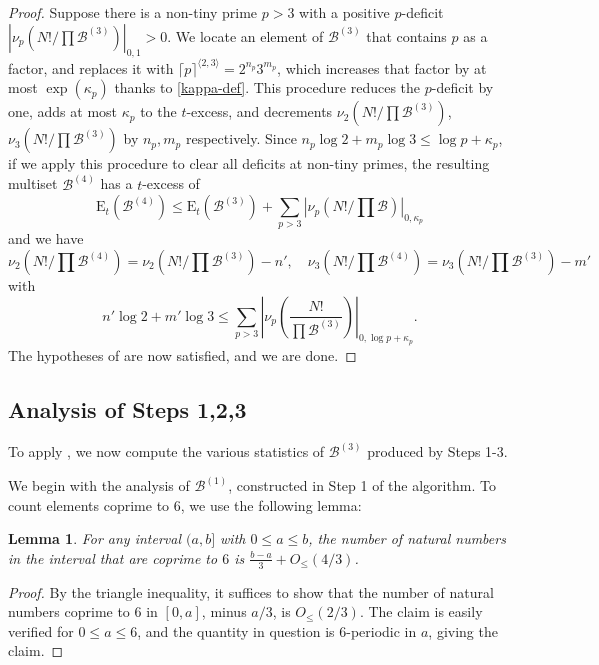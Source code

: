 \documentclass[12pt,a4paper,reqno]{amsart}
\numberwithin{equation}{section}
\theoremstyle{plain}
\newtheorem{lemma}[theorem]{Lemma}
\theoremstyle{definition}
\newcommand\tuple{{\mathcal B}}
\newcommand\excess{{\mathrm{E}}}
\begin{document}
\begin{proof} Suppose there is a non-tiny prime $p>3$ with a positive $p$-deficit
$|\nu_p(N!/\prod \tuple^{(3)})|_{0,1} > 0$.  We locate an element of $\tuple^{(3)}$ that contains $p$ as a factor, and replaces it with $\lceil p \rceil^{\langle 2,3 \rangle} = 2^{n_p} 3^{m_p}$, which increases that factor by at most $\exp(\kappa_{p})$ thanks to \eqref{kappa-def}.  This procedure reduces the $p$-deficit by one, adds at most $\kappa_{p}$ to the $t$-excess, and decrements $\nu_2(N!/\prod \tuple^{(3)})$, $\nu_3(N!/\prod \tuple^{(3)})$ by $n_{p}, m_{p}$ respectively.  Since $n_{p} \log 2 + m_{p} \log 3 \leq \log p + \kappa_{p}$, if we apply this procedure to clear all deficits at non-tiny primes, the resulting multiset $\tuple^{(4)}$ has a $t$-excess of
$$ \excess_t(\tuple^{(4)}) \leq \excess_t(\tuple^{(3)})  + \sum_{p > 3} |\nu_p(N!/\prod \tuple)|_{0,\kappa_p}$$
and we have
$$ \nu_2(N!/\prod \tuple^{(4)}) = \nu_2(N!/\prod \tuple^{(3)}) - n', \quad \nu_3(N!/\prod \tuple^{(4)}) = \nu_3(N!/\prod \tuple^{(3)}) - m'$$
with
$$n' \log 2 + m' \log 3 \leq \sum_{p>3} \left|\nu_p\left(\frac{N!}{\prod \tuple^{(3)}}\right)\right|_{0, \log p+\kappa_{p}}.$$  
The hypotheses of  are now satisfied, and we are done.
\end{proof}


\subsection{Analysis of Steps 1,2,3}

To apply  , we now compute the various statistics of $\tuple^{(3)}$ produced by Steps 1-3.

We begin with the analysis of $\tuple^{(1)}$, constructed in Step 1 of the algorithm.  To count elements coprime to $6$, we use the following lemma:

\begin{lemma}\label{lit}  For any interval $(a,b]$ with $0 \leq a \leq b$, the number of natural numbers in the interval that are coprime to $6$ is $\frac{b-a}{3} + O_{\leq}(4/3)$.
\end{lemma}

\begin{proof}  By the triangle inequality, it suffices to show that the number of natural numbers coprime to $6$ in $[0,a]$, minus $a/3$, is $O_{\leq}(2/3)$.  The claim is easily verified for $0 \leq a \leq 6$, and the quantity in question is $6$-periodic in $a$, giving the claim.
\end{proof}
\end{document}
